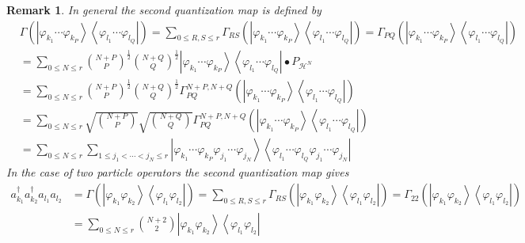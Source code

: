 \documentclass[aps,preprint]{revtex4}%
\newtheorem{remark}[theorem]{Remark}
\begin{document}
\begin{remark}
In general the second quantization map is defined by
\begin{align}
&  \Gamma\left(  \left\vert \varphi_{k_{1}}\cdots\varphi_{k_{P}}\right\rangle
\left\langle \varphi_{l_{1}}\cdots\varphi_{l_{Q}}\right\vert \right)
=\sum_{0\leq R,S\leq r}\Gamma_{RS}\left(  \left\vert \varphi_{k_{1}}%
\cdots\varphi_{k_{P}}\right\rangle \left\langle \varphi_{l_{1}}\cdots
\varphi_{l_{Q}}\right\vert \right)  =\Gamma_{PQ}\left(  \left\vert
\varphi_{k_{1}}\cdots\varphi_{k_{P}}\right\rangle \left\langle \varphi_{l_{1}%
}\cdots\varphi_{l_{Q}}\right\vert \right) \\
&  =\sum_{0\leq N\leq r}\binom{N+P}{P}^{\frac{1}{2}}\binom{N+Q}{Q}^{\frac
{1}{2}}\left\vert \varphi_{k_{1}}\cdots\varphi_{k_{P}}\right\rangle
\left\langle \varphi_{l_{1}}\cdots\varphi_{l_{Q}}\right\vert \bullet
P_{\mathcal{H}^{N}}\\
&  =\sum_{0\leq N\leq r}\binom{N+P}{P}^{\frac{1}{2}}\binom{N+Q}{Q}^{\frac
{1}{2}}\Gamma_{PQ}^{N+P,N+Q}\left(  \left\vert \varphi_{k_{1}}\cdots
\varphi_{k_{P}}\right\rangle \left\langle \varphi_{l_{1}}\cdots\varphi_{l_{Q}%
}\right\vert \right) \\
&  =\sum_{0\leq N\leq r}\sqrt{\binom{N+P}{P}}\sqrt{\binom{N+Q}{Q}}\Gamma
_{PQ}^{N+P,N+Q}\left(  \left\vert \varphi_{k_{1}}\cdots\varphi_{k_{P}%
}\right\rangle \left\langle \varphi_{l_{1}}\cdots\varphi_{l_{Q}}\right\vert
\right) \\
&  =\sum_{0\leq N\leq r}\sum_{1\leq j_{1}<\cdots<j_{N}\leq r}\left\vert
\varphi_{k_{1}}\cdots\varphi_{k_{P}}\varphi_{j_{1}}\cdots\varphi_{j_{N}%
}\right\rangle \left\langle \varphi_{l_{1}}\cdots\varphi_{l_{Q}}\varphi
_{j_{1}}\cdots\varphi_{j_{N}}\right\vert
\end{align}
In the case of two particle operators the second quantization map gives
\begin{align}
a_{k_{1}}^{\dagger}a_{k_{2}}^{\dagger}a_{l_{1}}a_{l_{2}}  &  =\Gamma\left(
\left\vert \varphi_{k_{1}}\varphi_{k_{2}}\right\rangle \left\langle
\varphi_{l_{1}}\varphi_{l_{2}}\right\vert \right)  =\sum_{0\leq R,S\leq
r}\Gamma_{RS}\left(  \left\vert \varphi_{k_{1}}\varphi_{k_{2}}\right\rangle
\left\langle \varphi_{l_{1}}\varphi_{l_{2}}\right\vert \right)  =\Gamma
_{22}\left(  \left\vert \varphi_{k_{1}}\varphi_{k_{2}}\right\rangle
\left\langle \varphi_{l_{1}}\varphi_{l_{2}}\right\vert \right) \\
&  =\sum_{0\leq N\leq r}\binom{N+2}{2}\left\vert \varphi_{k_{1}}\varphi
_{k_{2}}\right\rangle \left\langle \varphi_{l_{1}}\varphi_{l_{2}}\right\vert

\end{align}
\end{remark}
\end{document}
